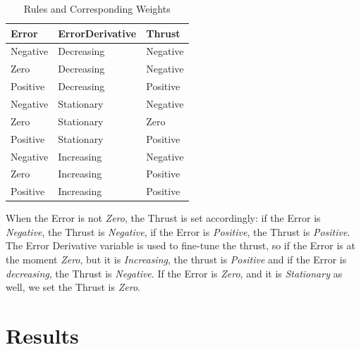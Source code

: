 \documentclass[12pt]{article}
\begin{document}
\begin{table}[h!]
    \centering
    \renewcommand{\arraystretch}{1.25} %
    \setlength{\tabcolsep}{10pt}      %
    \begin{tabular}{|p{3cm}|p{4cm}|p{3cm}|}
    \hline
    \textbf{\large Error} & \textbf{\large ErrorDerivative} & \textbf{\large Thrust} \\ \hline
    \large Negative       & \large Decreasing                & \large Negative        \\ \hline
    \large Zero           & \large Decreasing                & \large Negative        \\ \hline
    \large Positive       & \large Decreasing                & \large Positive        \\ \hline
    \large Negative       & \large Stationary                & \large Negative        \\ \hline
    \large Zero           & \large Stationary                & \large Zero            \\ \hline
    \large Positive       & \large Stationary                & \large Positive        \\ \hline
    \large Negative       & \large Increasing                & \large Negative        \\ \hline
    \large Zero           & \large Increasing                & \large Positive        \\ \hline
    \large Positive       & \large Increasing                & \large Positive        \\ \hline
    \end{tabular}
    \caption{Rules and Corresponding Weights}
    \label{tab:rules}
\end{table}
    
When the Error is not \textit{Zero}, the Thrust is set accordingly: if the Error is \textit{Negative}, the Thrust is \textit{Negative}, if the Error is \textit{Positive}, the Thrust is \textit{Positive}. The Error Derivative variable is used to fine-tune the thrust, so if the Error is at the moment \textit{Zero}, but it is \textit{Increasing}, the thrust is \textit{Positive} and if the Error is \textit{decreasing}, the Thrust is \textit{Negative}. If the Error is \textit{Zero}, and it is \textit{Stationary} as well, we set the Thrust is \textit{Zero}.
    
\section{Results}
\end{document}
